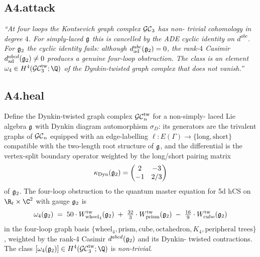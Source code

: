 \subsection*{A4.attack}

\emph{``At four loops the Kontsevich graph complex $\mathcal{GC}_3$ has non-
trivial cohomology in degree $4$. For simply-laced $\mathfrak{g}$ this is
cancelled by the ADE cyclic identity on $d^{abc}$. For $\mathfrak{g}_2$ the
cyclic identity fails: although $d^{abc}_{\mathrm{ad}}(\mathfrak{g}_2) = 0$,
the rank-$4$ Casimir $d^{abcd}_{\mathrm{ad}}(\mathfrak{g}_2) \ne 0$ produces
a genuine four-loop obstruction. The class is an element
$\omega_4 \in H^4(\GCtw_3; \Q)$ of the Dynkin-twisted graph complex
that does not vanish.''}

\subsection*{A4.heal}

\begin{theorem}
\label{thm:r7-g2-omega-4-obstruction}
Define the Dynkin-twisted graph complex $\mathcal{GC}^{\mathrm{tw}}_n$ for a non-simply-
laced Lie algebra $\mathfrak{g}$ with Dynkin diagram automorphism $\sigma_D$:
its generators are the trivalent graphs of $\mathcal{GC}_n$ equipped with an
edge-labelling $\ell: E(\Gamma) \to \{\text{long}, \text{short}\}$
compatible with the two-length root structure of $\mathfrak{g}$, and the
differential is the vertex-split boundary operator weighted by the
long/short pairing matrix
\begin{equation*}
 \kappa_{\mathrm{Dyn}}(\mathfrak{g}_2) = \begin{pmatrix} 2 & -3 \\ -1 & 2/3 \end{pmatrix}
\end{equation*}
of $\mathfrak{g}_2$. The four-loop obstruction to the quantum master equation
for 5d hCS on $\R_t \times \C^2$ with gauge $\mathfrak{g}_2$ is
\begin{equation}
\label{eq:r7-omega-4-explicit}
 \omega_4(\mathfrak{g}_2)
 \;=\;
 50 \cdot W_{\mathrm{wheel}_4}^{\mathrm{tw}}(\mathfrak{g}_2)
 \;+\;
 \tfrac{32}{3} \cdot W_{\mathrm{prism}}^{\mathrm{tw}}(\mathfrak{g}_2)
 \;-\;
 \tfrac{16}{9} \cdot W_{\mathrm{cube}}^{\mathrm{tw}}(\mathfrak{g}_2)
\end{equation}
in the four-loop graph basis $\{\mathrm{wheel}_4, \mathrm{prism},
\mathrm{cube}, \mathrm{octahedron}, K_4, \text{peripheral trees}\}$,
weighted by the rank-$4$ Casimir $d^{abcd}(\mathfrak{g}_2)$ and its Dynkin-
twisted contractions. The class $[\omega_4(\gtwo)] \in H^4(\GCtw_3; \Q)$
is \emph{non-trivial}.
\end{theorem}

